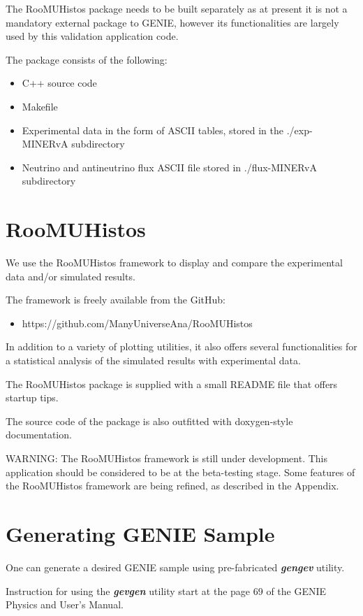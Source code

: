 The RooMUHistos package needs to be built separately as at present it is not a mandatory external package to GENIE,
however its functionalities are largely used by this validation application code.

The package consists of the following:
\begin{itemize}
\item{C++ source code}
\item{Makefile}
\item{Experimental data in the form of ASCII tables, stored in the ./exp-MINERvA subdirectory}
\item{Neutrino and antineutrino flux ASCII file stored in ./flux-MINERvA subdirectory}
\end{itemize}

\section{RooMUHistos}

We use the RooMUHistos framework to display and compare the experimental data and/or simulated results.

The framework is freely available from the GitHub:
\begin{itemize}
\item{https://github.com/ManyUniverseAna/RooMUHistos}
\end{itemize}

In addition to a variety of plotting utilities, it also offers several functionalities for a statistical 
analysis of the simulated results with experimental data.

The RooMUHistos package is supplied with a small README file that offers startup tips.

The source code of the package is also outfitted with doxygen-style documentation.

WARNING: The RooMUHistos framework is still under development. This application should be considered to be
at the beta-testing stage. Some features of the RooMUHistos framework are being refined, as described in the Appendix.

\section{Generating GENIE Sample}

One can generate a desired GENIE sample using pre-fabricated { \bf \it gengev } utility.

Instruction for using the { \bf \it gevgen} utility start at the page 69 of 
the GENIE Physics and User's Manual\cite{geniemanual}. 


